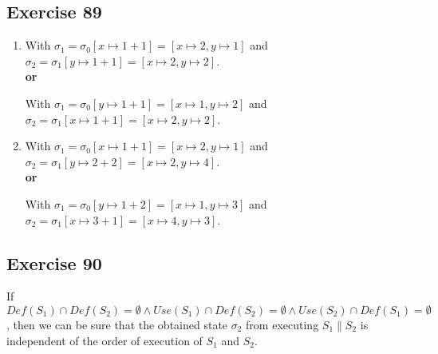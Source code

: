\documentclass[12pt,fleqn]{article}		%
\begin{document}
\subsection{Exercise 89}
\begin{enumerate}
\item 
\begin{prooftree}
\end{prooftree}
With $ \sigma_1 = \sigma_0[x \mapsto 1 + 1] = [x \mapsto 2, y \mapsto 1] $ and $ \sigma_2 = \sigma_1[y \mapsto 1 + 1] = [x \mapsto 2, y \mapsto 2] $.\\
\textbf{or}
\begin{prooftree}
\end{prooftree}
With $ \sigma_1 = \sigma_0[y \mapsto 1 + 1] = [x \mapsto 1, y \mapsto 2] $ and $ \sigma_2 = \sigma_1[x \mapsto 1 + 1] = [x \mapsto 2, y \mapsto 2] $.\\

\item
\begin{prooftree}
\end{prooftree}
With $ \sigma_1 = \sigma_0[x \mapsto 1 + 1] = [x \mapsto 2, y \mapsto 1] $ and $ \sigma_2 = \sigma_1[y \mapsto 2 + 2] = [x \mapsto 2, y \mapsto 4] $.\\
\textbf{or}
\begin{prooftree}
\end{prooftree}
With $ \sigma_1 = \sigma_0[y \mapsto 1 + 2] = [x \mapsto 1, y \mapsto 3] $ and $ \sigma_2 = \sigma_1[x \mapsto 3 + 1] = [x \mapsto 4, y \mapsto 3] $.\\
\end{enumerate}

\subsection{Exercise 90}
If $ Def(S_1) \cap Def(S_2) = \emptyset \land Use(S_1) \cap Def(S_2) = \emptyset \land Use(S_2) \cap Def(S_1) = \emptyset $, then we can be sure that the obtained state $ \sigma_2 $ from executing $ S_1 \parallel S_2 $ is independent of the order of execution of $ S_1 $ and $ S_2 $.
\end{document}
